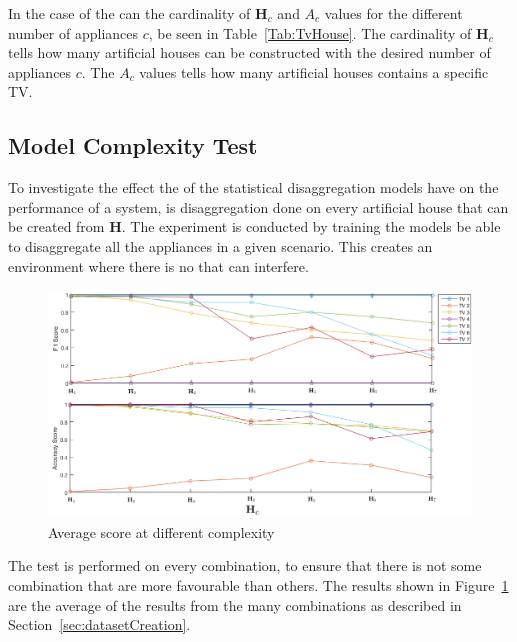 

In the case of the  can the cardinality of $\textbf{H}_c$ and $A_c$ values for the different number of appliances $c$, be seen in Table~\ref{Tab:TvHouse}. The cardinality of $\textbf{H}_c$ tells how many artificial houses can be constructed with the desired number of appliances $c$. The $A_c$ values tells how many artificial houses contains a specific TV.


\subsection{Model Complexity Test}
\label{sec:MCT}
To investigate the effect the  of the statistical disaggregation models have on the performance of a  system, is disaggregation done on every artificial house that can be created from $\textbf{H}$. The experiment is conducted by training the models be able to disaggregate all the appliances in a given scenario. This creates an environment where there is no  that can interfere.

\begin{figure}[H]
\centering
\includegraphics[width=1\textwidth]{billeder/ModelSize.png}
\caption{Average score at different complexity }
\label{fig:COMPT}
\end{figure}

The test is performed on every combination, to ensure that there is not some combination that are more favourable than others. The results shown in Figure~\ref{fig:COMPT} are the average of the results from the many combinations as described in Section~\ref{sec:datasetCreation}. 


